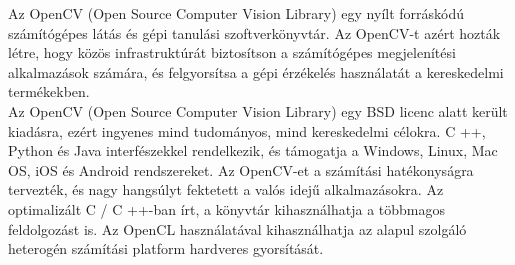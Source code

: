 

Az OpenCV (Open Source Computer Vision Library) egy nyílt forráskódú számítógépes látás és gépi tanulási szoftverkönyvtár. Az OpenCV-t azért hozták létre, hogy közös infrastruktúrát biztosítson a számítógépes megjelenítési alkalmazások számára, és felgyorsítsa a gépi érzékelés használatát a kereskedelmi termékekben. 
\\

\noindent Az OpenCV (Open Source Computer Vision Library) egy BSD licenc alatt került kiadásra, ezért ingyenes mind tudományos, mind kereskedelmi célokra. C ++, Python és Java interfészekkel rendelkezik, és támogatja a Windows, Linux, Mac OS, iOS és Android rendszereket. Az OpenCV-et a számítási hatékonyságra tervezték, és nagy hangsúlyt fektetett a valós idejű alkalmazásokra. Az optimalizált C / C ++-ban írt, a könyvtár kihasználhatja a többmagos feldolgozást is. Az OpenCL használatával kihasználhatja az alapul szolgáló heterogén számítási platform hardveres gyorsítását.
\\

